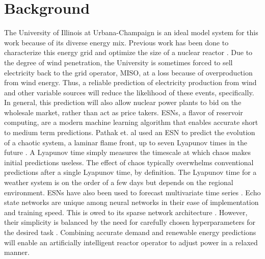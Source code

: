 \section{Background}
The University of Illinois at Urbana-Champaign is an ideal model system for
this work because of its diverse energy mix. Previous work has been done to
characterize this energy grid and optimize the size of a nuclear reactor \cite{dotson_optimal_2020}. Due to the degree of wind penetration, the University is sometimes
forced to sell electricity back to the grid operator, MISO, at a loss because of overproduction
from wind energy. Thus, a reliable prediction of electricity production from
wind and other variable sources will reduce the likelihood of these events,
specifically. In general, this prediction will also allow nuclear power plants
to bid on the wholesale market, rather than act as price takers.
\acrshort{ESN}s, a flavor of reservoir computing, are a modern
machine learning algorithm that enables accurate short
to medium term predictions. Pathak et. al used an \acrshort{ESN} to predict the
evolution of a chaotic system, a laminar flame front, up to seven Lyapunov
times in the future \cite{pathak_model-free_2018, wikner_combining_2020}. A
Lyapunov time simply measures the timescale at which chaos makes initial
predictions useless. The effect of chaos typically overwhelms conventional
predictions after a single Lyapunov time, by definition.
The Lyapunov time for a weather system is on the order of a few days but
depends on the regional environment. \acrshort{ESN}s have also been used to
forecast multivariate time series
\cite{bianchi_reservoir_2020}. Echo state networks are unique among neural
networks in their ease of implementation and training speed. This is owed to its
sparse network architecture \cite{pathak_model-free_2018,
wikner_combining_2020, vannitsem_predictability_2017}. However,
their simplicity is balanced by the need for carefully chosen hyperparameters
for the desired task \cite{lukosevicius_practical_2012}.
Combining accurate demand and
renewable energy predictions will enable an artificially intelligent reactor
operator to adjust power in a relaxed manner.
